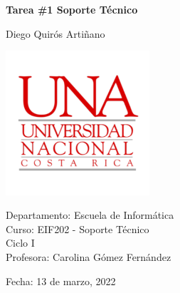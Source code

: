 \documentclass[12pt, a4paper, twocolumn]{article}
\begin{document}
\begin{titlepage}
    \begin{flushleft}
        \textbf{\Large Tarea \#1 Soporte Técnico}
        \newline

        \large Diego Quirós Artiñano \\
        
        \vfill
        
        \includegraphics[width=0.4\textwidth]{UNA.png}

        Departamento: Escuela de Informática \\
        Curso: EIF202 - Soporte Técnico \\
        Ciclo I \\
        Profesora: Carolina Gómez Fernández \newline

        Fecha: 13 de marzo, 2022
    \end{flushleft}
\end{titlepage}
\end{document}
